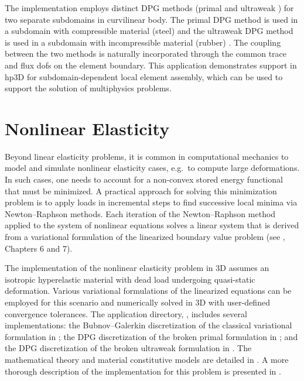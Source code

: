 The implementation employs distinct DPG methods (primal and ultraweak \cite{keith2016elasticity}) for two separate subdomains in curvilinear body. The primal DPG method is used in a subdomain with compressible material (steel) and the ultraweak DPG method is used in a subdomain with incompressible material (rubber) \cite{fuentes2017coupled}. The coupling between the two methods is naturally incorporated through the common trace and flux dofs on the element boundary. This application demonstrates support in hp3D for subdomain-dependent local element assembly, which can be used to support the solution of multiphysics problems.

\section{Nonlinear Elasticity}
\label{sec:nonlinear-elasticity}

Beyond linear elasticity problems, it is common in computational mechanics to model and simulate nonlinear elasticity cases, e.g.~to compute large deformations. In such cases, one needs to account for a non-convex stored energy functional that must be minimized. A practical approach for solving this minimization problem is to apply loads in incremental steps to find successive local minima via Newton--Raphson methods. Each iteration of the Newton--Raphson method applied to the system of nonlinear equations solves a linear system that is derived from a variational formulation of the linearized boundary value problem (see \cite{mora2020polydpg}, Chapters 6 and 7). 

The implementation of the nonlinear elasticity problem in \hp3D assumes an isotropic hyperelastic material with dead load undergoing quasi-static deformation. Various variational formulations of the linearized equations can be employed for this scenario and numerically solved in \hp3D with user-defined convergence tolerances. The application directory, , includes several implementations: the Bubnov--Galerkin discretization of the classical variational formulation in ; the DPG discretization of the broken primal formulation in ; and the DPG discretization of the broken ultraweak formulation in . The mathematical theory and material constitutive models are detailed in \cite{mora2020polydpg}. A more thorough description of the implementation for this problem is presented in  \cite{hpbook3}.

